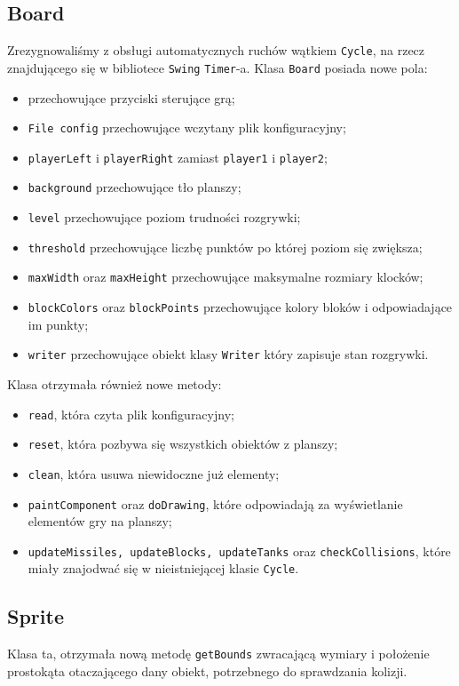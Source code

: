 \documentclass[12pt]{report}
\newcommand{\code}[1]{\texttt{#1}}
\begin{document}
     \subsection{Board}
     Zrezygnowaliśmy z obsługi automatycznych ruchów wątkiem \code{Cycle}, na rzecz znajdującego się w bibliotece \code{Swing} \code{Timer}-a.
     Klasa \code{Board} posiada nowe pola:
     \begin{itemize}
         \item przechowujące przyciski sterujące grą;
         \item \code{File config} przechowujące wczytany plik konfiguracyjny;
         \item \code{playerLeft} i \code{playerRight} zamiast \code{player1} i \code{player2};
         \item \code{background} przechowujące tło planszy;
         \item \code{level} przechowujące poziom trudności rozgrywki;
         \item \code{threshold} przechowujące liczbę punktów po której poziom się zwiększa;
         \item \code{maxWidth} oraz \code{maxHeight} przechowujące maksymalne rozmiary klocków;
         \item \code{blockColors} oraz \code{blockPoints} przechowujące kolory bloków i odpowiadające im punkty;
         \item \code{writer} przechowujące obiekt klasy \code{Writer} który zapisuje stan rozgrywki.
     \end{itemize}
     Klasa otrzymała również nowe metody:
     \begin{itemize}
         \item \code{read}, która czyta plik konfiguracyjny;
         \item \code{reset}, która pozbywa się wszystkich obiektów z planszy;
         \item \code{clean}, która usuwa niewidoczne już elementy;
         \item \code{paintComponent} oraz \code{doDrawing}, które odpowiadają za wyświetlanie elementów gry na planszy;
         \item \code{updateMissiles, updateBlocks, updateTanks} oraz \code{checkCollisions}, które miały znajodwać się w nieistniejącej klasie \code{Cycle}.
     \end{itemize}
     
     \subsection{Sprite}
     Klasa ta, otrzymała nową metodę \code{getBounds} zwracającą wymiary i położenie prostokąta otaczającego dany obiekt, potrzebnego do sprawdzania kolizji.
     
\end{document}
